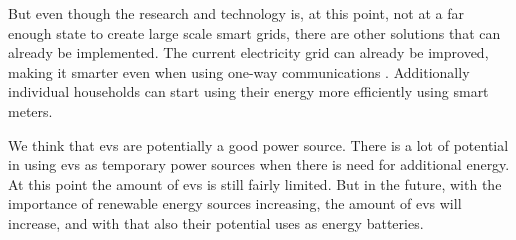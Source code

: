 But even though the research and technology is, at this point, not at a far enough state to create large scale smart grids, there are other solutions that can already be implemented. The current electricity grid can already be improved, making it smarter even when using one-way communications \cite{Alamaniotis2010}. Additionally individual households can start using their energy more efficiently using smart meters. 

We think that \acp{ev} are potentially a good power source. There is a lot of potential in using \acp{ev} as temporary power sources when there is need for additional energy. At this point the amount of \acp{ev} is still fairly limited. But in the future, with the importance of renewable energy sources increasing, the amount of \acp{ev} will increase, and with that also their potential uses as energy batteries. 